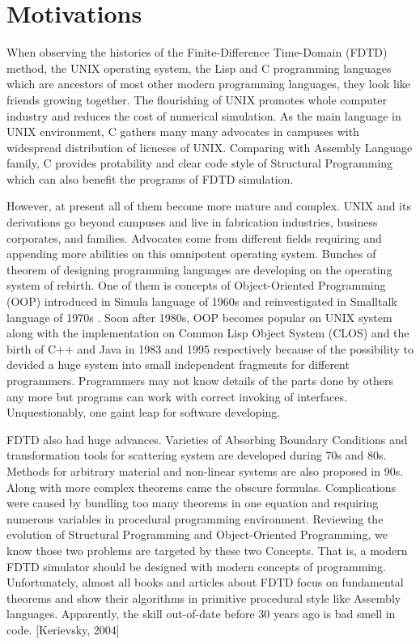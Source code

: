 \section{Motivations}
When observing the histories of the Finite-Difference Time-Domain (FDTD) method, the UNIX operating system, the Lisp and
C programming languages which are ancestors of most other modern programming languages, they look like friends growing
together. The flourishing of UNIX promotes whole computer industry and reduces the cost of numerical simulation. As the
main language in UNIX environment, C gathers many many advocates in campuses with widespread distribution of licneses of
UNIX. Comparing with Assembly Language family, C provides protability and clear code style of Structural Programming
which can also benefit the programs of FDTD simulation.

However, at present all of them become more mature and complex. UNIX and its derivations go beyond campuses and live in
fabrication industries, business corporates, and families. Advocates come from different fields requiring and appending
more abilities on this omnipotent operating system. Bunches of theorem of designing programming languages are developing
on the operating system of rebirth. One of them is concepts of Object-Oriented Programming (OOP) introduced in Simula
language of 1960s and reinvestigated in Smalltalk language of 1970s \cite[Sebesta 2008]{sebesta}. Soon after 1980s, OOP
becomes popular on UNIX system along with the implementation on Common Lisp Object System (CLOS) and the birth of C++
and Java in 1983 and 1995 respectively because of the possibility to devided a huge system into small independent
fragments for different programmers. Programmers may not know details of the parts done by others any more but programs
can work with correct invoking of interfaces. Unquestionably, one gaint leap for software developing.

FDTD also had huge advances. Varieties of Absorbing Boundary Conditions and transformation tools for scattering system
are developed during 70s and 80s. Methods for arbitrary material and non-linear systems are also proposed in 90s. Along
with more complex theorems came the obscure formulas. Complications were caused by bundling too many theorems in one
equation and requiring numerous variables in procedural programming environment. Reviewing the evolution of Structural
Programming and Object-Oriented Programming, we know those two problems are targeted by these two Concepts. That is, a
modern FDTD simulator should be designed with modern concepts of programming. Unfortunately, almost all books and
articles about FDTD focus on fundamental theorems and show their algorithms in primitive procedural style like Assembly
languages. Apparently, the skill out-of-date before 30 years ago is bad smell in code. [Kerievsky, 2004]


